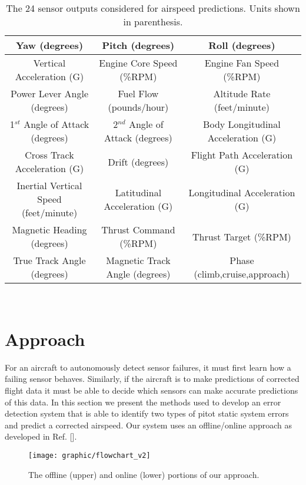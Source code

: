 \documentclass[]{aiaa-tc}
\begin{document}
\begin{table}
\centering
  \caption{\label{sensorList}The 24 sensor outputs considered for airspeed predictions. Units shown in parenthesis.}
  \begin{tabular}{ ccc }
    \hline
    \hline
    Yaw (degrees)& Pitch (degrees) & Roll (degrees)\\ \hline
    Vertical Acceleration (G)& Engine Core Speed (\%RPM)& Engine Fan Speed (\%RPM)\\ \hline
    Power Lever Angle (degrees)& Fuel Flow (pounds/hour)& Altitude Rate (feet/minute)\\ \hline
    1$^{st}$ Angle of Attack (degrees)& 2$^{nd}$ Angle of Attack (degrees)& Body Longitudinal Acceleration (G)\\ \hline
    Cross Track Acceleration (G)& Drift (degrees) & Flight Path Acceleration (G)\\ \hline
    Inertial Vertical Speed (feet/minute)& Latitudinal Acceleration (G) & Longitudinal Acceleration (G)\\ \hline
    Magnetic Heading (degrees)& Thrust Command (\%RPM)& Thrust Target (\%RPM)\\ \hline
    True Track Angle (degrees)& Magnetic Track Angle (degrees) & Phase (climb,cruise,approach)\\  \hline \hline
 \end{tabular}
\end{table}

~\vfill
\section{Approach }
\label{sec:approach}
For an aircraft to autonomously detect sensor failures, it must first learn how a failing sensor behaves. Similarly, if the aircraft is to make predictions of corrected flight data it must be able to decide which sensors can make accurate predictions of this data. In this section we present the methods used to develop an error detection system that is able to identify two types of pitot static system errors and predict a corrected airspeed. Our system uses an offline/online approach as developed  in Ref. []. 

\begin{figure}
\centering
\texttt{[image: graphic/flowchart\_v2]}
\caption{The offline (upper) and online (lower) portions of our approach. }
\label{fig:flowchart}
\end{figure}
\end{document}
